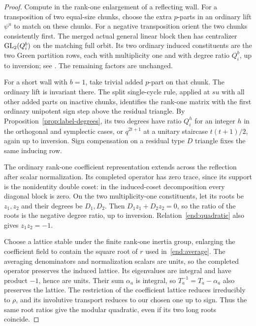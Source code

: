 \begin{proof}
Compute in the rank-one enlargement of a reflecting wall.
For a transposition of two equal-size chunks, choose the extra
$p$-parts in an ordinary lift $\psi^u$ to match on these chunks.
For a negative transposition orient the two chunks consistently
first.  The merged actual general linear block then has
centralizer $\operatorname{GL}_2(Q_i^b)$ on the matching full orbit.  Its two
ordinary induced constituents are the two Green partition rows,
each with multiplicity one and with degree ratio $Q_i^b$, up to
inversion; see \cite[Equation~(2.3.7)]{BrundanDipperKleshchev}.
The remaining factors are unchanged.

For a short wall with $b=1$, take trivial added $p$-part on that
chunk.  The ordinary lift is invariant there.  The split
single-cycle rule, applied at $su$ with all other added parts on
inactive chunks, identifies the rank-one matrix with the first
ordinary unipotent sign step above the residual triangle.
By Proposition~\ref{prop:label-degrees}, its two degrees have
ratio $Q_i^h$ for an integer $h$ in the orthogonal and
symplectic cases, or $q^{2t+1}$ at a unitary staircase
$t(t+1)/2$, again up to inversion.  Sign compensation on a
residual type $D$ triangle fixes the same inducing row.

The ordinary rank-one coefficient representation extends across
the reflection after scalar normalization.  Its completed
operator has zero trace, since its support is the nonidentity
double coset: in the induced-coset decomposition every diagonal
block is zero.  On the two multiplicity-one constituents, let
its roots be $z_1,z_2$ and their degrees be $D_1,D_2$.  Then
$D_1z_1+D_2z_2=0$, so the ratio of the roots is the negative
degree ratio, up to inversion.  Relation~\eqref{end:quadratic}
also gives $z_1z_2=-1$.

Choose a lattice stable under the finite rank-one inertia group,
enlarging the coefficient field to contain the square root of
$r$ used in~\eqref{end:average}.  The averaging denominators and
normalization scalars are units, so the completed operator preserves
the induced lattice.  Its eigenvalues are integral and have product
$-1$, hence are units.  Their sum $\alpha_a$ is integral, so
$T_a^{-1}=T_a-\alpha_a$ also preserves the lattice.
The restriction of the coefficient lattice reduces
irreducibly to $\rho$, and its involutive transport reduces to
our chosen one up to sign.  Thus the same root ratios give the
modular quadratic, even if its two long roots coincide.


\end{proof}
